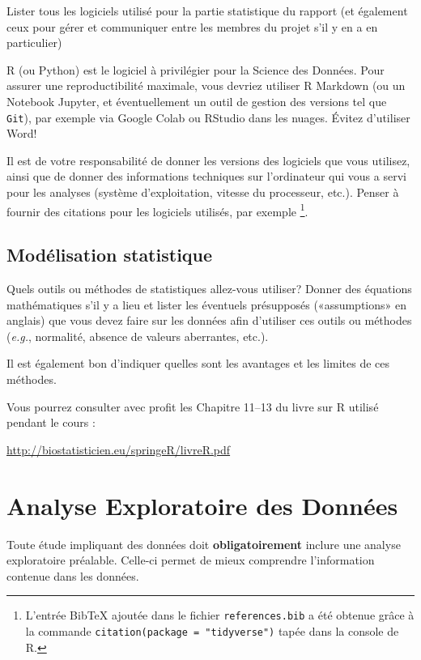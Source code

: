 \documentclass[mstat,12pt]{unswthesis}
\begin{document}
Lister tous les logiciels utilisé pour la partie statistique du rapport
(et également ceux pour gérer et communiquer entre les membres du projet
s'il y en a en particulier)

\medskip

R (ou Python) est le logiciel à privilégier pour la Science des Données.
Pour assurer une reproductibilité maximale, vous devriez utiliser R
Markdown (ou un Notebook Jupyter, et éventuellement un outil de gestion
des versions tel que \texttt{Git}), par exemple via Google Colab ou
RStudio dans les nuages. Évitez d'utiliser Word!

\bigskip

Il est de votre responsabilité de donner les versions des logiciels que
vous utilisez, ainsi que de donner des informations techniques sur
l'ordinateur qui vous a servi pour les analyses (système d'exploitation,
vitesse du processeur, etc.). Penser à fournir des citations pour les
logiciels utilisés, par exemple
\footnote{L'entrée BibTeX ajoutée dans le fichier \texttt{references.bib} a été obtenue grâce à la commande  \texttt{citation(package = "tidyverse")} tapée dans la console de R.}.

\section{Modélisation statistique}\label{moduxe9lisation-statistique}

Quels outils ou méthodes de statistiques allez-vous utiliser? Donner des
équations mathématiques s'il y a lieu et lister les éventuels
présupposés («assumptions» en anglais) que vous devez faire sur les
données afin d'utiliser ces outils ou méthodes (\emph{e.g.}, normalité,
absence de valeurs aberrantes, etc.).

Il est également bon d'indiquer quelles sont les avantages et les
limites de ces méthodes.

Vous pourrez consulter avec profit les Chapitre 11--13 du livre sur R
utilisé pendant le cours :

\url{http://biostatisticien.eu/springeR/livreR.pdf}

\chapter{Analyse Exploratoire des
Données}\label{analyse-exploratoire-des-donnuxe9es}

Toute étude impliquant des données doit \textbf{obligatoirement} inclure
une analyse exploratoire préalable. Celle-ci permet de mieux comprendre
l'information contenue dans les données.
\end{document}
